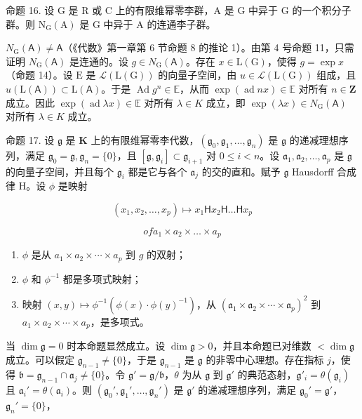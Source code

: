 命题 16. 设 G 是 R 或 C 上的有限维幂零李群，A 是 G 中异于 G 的一个积分子群。则 \(\mathrm{N}_{\mathrm{G}}(\mathrm{A})\) 是 G 中异于 A 的连通李子群。

\(N_{\mathrm{G}}(\mathsf{A}) \neq \mathsf{A}\)（《代数》第一章第 6 节命题 8 的推论 1）。由第 4 号命题 11，只需证明 \(N_{\mathrm{G}}(\mathsf{A})\) 是连通的。设 \(g \in N_{\mathrm{G}}(\mathsf{A})\)。存在 \(x \in \mathrm{L}(\mathrm{G})\)，使得 \(g = \exp x\)（命题 14）。设 \(\mathrm{E}\) 是 \(\mathcal{L}(\mathrm{L}(\mathrm{G}))\) 的向量子空间，由 \(u \in \mathcal{L}(\mathrm{L}(\mathrm{G}))\) 组成，且 \(u(\mathrm{L}(\mathsf{A})) \subset \mathrm{L}(\mathsf{A})\)。于是 \(\operatorname{Ad} g^n \in \mathbb{E}\)，从而 \(\exp (\operatorname{ad} nx) \in \mathbb{E}\) 对所有 \(n \in \mathbf{Z}\) 成立。因此 \(\exp (\operatorname{ad} \lambda x) \in \mathbb{E}\) 对所有 \(\lambda \in K\) 成立，即 \(\exp (\lambda x) \in N_{\mathrm{G}}(\mathsf{A})\) 对所有 \(\lambda \in K\) 成立。

命题 17. 设 \(\mathfrak{g}\) 是 \(\mathbf{K}\) 上的有限维幂零李代数，\((\mathfrak{g}_0, \mathfrak{g}_1, \ldots, \mathfrak{g}_n)\) 是 \(\mathfrak{g}\) 的递减理想序列，满足 \(\mathfrak{g}_0 = \mathfrak{g}, \mathfrak{g}_n = \{0\}\)，且 \([\mathfrak{g}, \mathfrak{g}_i] \subset \mathfrak{g}_{i+1}\) 对 \(0 \leqslant i < n\)。设 \(\mathfrak{a}_1, \mathfrak{a}_2, \ldots, \mathfrak{a}_p\) 是 \(\mathfrak{g}\) 的向量子空间，并且每个 \(\mathfrak{g}_i\) 都是它与各个 \(\mathfrak{a}_j\) 的交的直和。赋予 \(\mathfrak{g}\) Hausdorff 合成律 H。设 \(\phi\) 是映射

\[
\left(x _ {1}, x _ {2}, \dots , x _ {p}\right) \mapsto x _ {1} \mathsf {H} x _ {2} \mathsf {H} \dots \mathsf {H} x _ {p}
\]

\[
o f a _ {1} \times a _ {2} \times \dots \times a _ {p}
\]

\begin{enumerate}
\def\labelenumi{(\roman{enumi})}
\item
  \(\phi\) 是从 \(a_{1} \times a_{2} \times \cdots \times a_{p}\) 到 \(g\) 的双射；
\item
  \(\phi\) 和 \(\phi^{-1}\) 都是多项式映射；
\item
  映射 \((x,y)\mapsto\phi^{-1}(\phi(x)\cdot\phi(y)^{-1})\)，从 \((\mathfrak{a}_{1}\times\mathfrak{a}_{2}\times\cdots\times\mathfrak{a}_{p})^{2}\) 到 \(a_{1}\times a_{2}\times\cdots\times a_{p}\)，是多项式。
\end{enumerate}

当 \(\dim \mathfrak{g} = 0\) 时本命题显然成立。设 \(\dim \mathfrak{g} > 0\)，并且本命题已对维数 \(<\dim \mathfrak{g}\) 成立。可以假定 \(\mathfrak{g}_{n-1} \neq \{0\}\)，于是 \(\mathfrak{g}_{n-1}\) 是 \(\mathfrak{g}\) 的非零中心理想。存在指标 \(j\)，使得 \(\mathfrak{b} = \mathfrak{g}_{n-1} \cap \mathfrak{a}_j \neq \{0\}\)。令 \(\mathfrak{g}' = \mathfrak{g}/\mathfrak{b}\)，\(\theta\) 为从 \(\mathfrak{g}\) 到 \(\mathfrak{g}'\) 的典范态射，\(\mathfrak{g}'_i = \theta(\mathfrak{g}_i)\) 且 \(\mathfrak{a}_i' = \theta(\mathfrak{a}_i)\)。则 \((\mathfrak{g}_0', \mathfrak{g}_1', \ldots, \mathfrak{g}_n')\) 是 \(\mathfrak{g}'\) 的递减理想序列，满足 \(\mathfrak{g}_0' = \mathfrak{g}'\)，\(\mathfrak{g}_n' = \{0\}\)，

